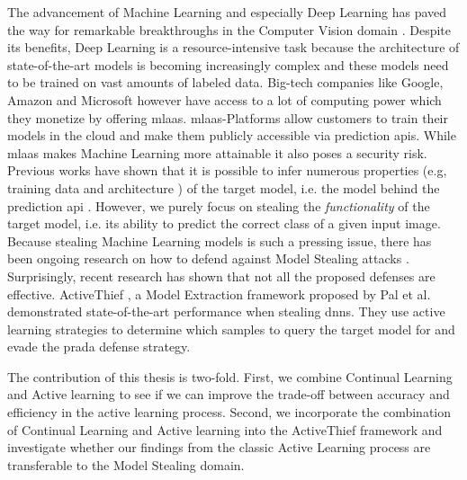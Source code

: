 \Abstract
The advancement of Machine Learning and especially Deep Learning has paved the way for remarkable breakthroughs in the Computer Vision domain \cite{he2016deep}
\cite{goodfellow2020generative} \cite{lecun1989backpropagation}. Despite its benefits, Deep Learning is a resource-intensive task because the architecture
of state-of-the-art models is becoming increasingly complex and these models need to be trained on vast amounts of labeled data. Big-tech companies like Google,
Amazon and Microsoft however have access to a lot of computing power which they monetize by offering \gls{mlaas}. \gls{mlaas}-Platforms
allow customers to train their models in the cloud and make them publicly accessible via prediction \glspl{api}. While \gls{mlaas} makes Machine Learning more
attainable it also poses a security risk. Previous works have shown that it is possible to infer numerous properties (e.g, training data \cite{shokri2017membership}
and architecture \cite{oh2019towards}) of the target model, i.e. the model behind the prediction \gls{api} \cite{tramer2016stealing}
\cite{papernot2017practical}. However, we purely focus on stealing the \textit{functionality} of the target model, i.e. its ability to predict the correct class
of a given input image. Because stealing Machine Learning models is such a pressing issue, there has been ongoing research on how to defend against Model Stealing
attacks \cite{orekondy2019prediction} \cite{juuti2019prada}. Surprisingly, recent research has shown that not all the proposed defenses are effective.
ActiveThief \cite{pal2020activethief}, a Model Extraction framework proposed by Pal et al. demonstrated state-of-the-art performance when stealing \glspl{dnn}.
They use active learning strategies to determine which samples to query the target model for and evade the \gls{prada} \cite{juuti2019prada} defense strategy. \par
The contribution of this thesis is two-fold. First, we combine Continual Learning and Active learning to see if we can improve the trade-off between accuracy and 
efficiency in the active learning process. Second, we incorporate the combination of Continual Learning and Active learning into the ActiveThief framework and
investigate whether our findings from the classic Active Learning process are transferable to the Model Stealing domain.
